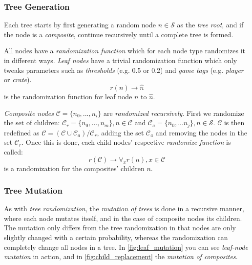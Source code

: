 \documentclass[a4paper, twocolumn]{article}
\begin{document}
        \subsubsection*{Tree Generation}

        Each tree starts by first generating a random node \(n \in \mathcal{S}\) as the \emph{tree root}, and if the node is a \textit{composite}, continue recursively until a complete tree is formed.

        All nodes have a \textit{randomization function} which for each node type randomizes it in different ways. \emph{Leaf nodes} have a trivial randomization function which only tweaks parameters such as \emph{thresholds} (e.g. 0.5 or 0.2) and \emph{game tags} (e.g. \emph{player} or \emph{crate}).
        \begin{equation*}
        \label{eq:leaf-randomization}
            r(n) \rightarrow \hat{n}
        \end{equation*}
        is the randomization function for leaf node \(n\) to \(\hat{n}\).


        \emph{Composite nodes} \(\mathcal{C} = \{n_0,...,n_i\}\) are \emph{randomized recursively}. First we randomize the set of children: \(\mathcal{C}_r = \{n_0,...,n_m\}, n \in \mathcal{C}\) and \(\mathcal{C}_a = \{n_0,...n_j\}, n \in \mathcal{S}\). \(\mathcal{C}\) is then redefined as \(\mathcal{C} = (\mathcal{C} \cup \mathcal{C}_a)/ \mathcal{C}_r\), adding the set \(\mathcal{C}_a\) and removing the nodes in the set \(\mathcal{C}_r\). Once this is done, each child nodes' respective \textit{randomize function} is called:
        \begin{equation*}
        \label{eq:composite-randomlization}
            r(\mathcal{C}) \rightarrow \forall_{x} r(n),x \in \mathcal{C}
        \end{equation*}
         is a randomization for the composites' children \(n\).

        \subsubsection*{Tree Mutation}

        As with \textit{tree randomization}, the \emph{mutation of trees} is done in a recursive manner, where each node mutates itself, and in the case of composite nodes its children. The mutation only differs from the tree randomization in that nodes are only slightly changed with a certain probability, whereas the randomization can completely change all nodes in a tree. In \cref{fig:leaf_mutation} you can see \emph{leaf-node mutation} in action, and in \cref{fig:child_replacement} the \emph{mutation of composites}.
\end{document}
